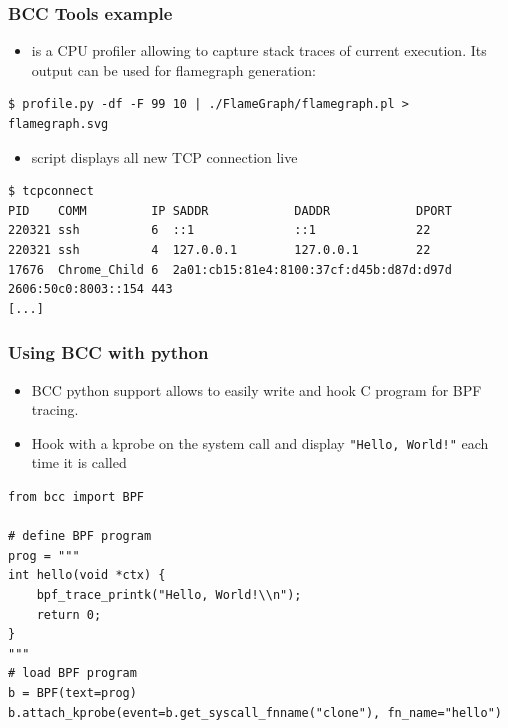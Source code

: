 \begin{frame}[fragile]
  \frametitle{BCC Tools example}
  \begin{itemize}
    \item {} is a CPU profiler allowing to capture stack traces of
          current execution. Its output can be used for flamegraph generation:
  \end{itemize}
  \begin{block}{}
    \begin{verbatim}
$ profile.py -df -F 99 10 | ./FlameGraph/flamegraph.pl > flamegraph.svg
    \end{verbatim}
  \end{block}
  \begin{itemize}
    \item {} script displays all new TCP connection live
  \end{itemize}
  \begin{block}{}
    \begin{verbatim}
$ tcpconnect
PID    COMM         IP SADDR            DADDR            DPORT
220321 ssh          6  ::1              ::1              22   
220321 ssh          4  127.0.0.1        127.0.0.1        22   
17676  Chrome_Child 6  2a01:cb15:81e4:8100:37cf:d45b:d87d:d97d 2606:50c0:8003::154 443  
[...]
    \end{verbatim}
  \end{block}
\end{frame}

\begin{frame}[fragile]
  \frametitle{Using BCC with python}
  \begin{itemize}
    \item BCC python support allows to easily write and hook C program for BPF
          tracing.
    \item Hook with a kprobe on the  system call and display \verb+"Hello, World!"+ each
          time it is called
  \end{itemize}
  \begin{block}{}
    \begin{verbatim}
from bcc import BPF

# define BPF program
prog = """
int hello(void *ctx) {
    bpf_trace_printk("Hello, World!\\n");
    return 0;
}
"""
# load BPF program
b = BPF(text=prog)
b.attach_kprobe(event=b.get_syscall_fnname("clone"), fn_name="hello")
    \end{verbatim}
  \end{block}
\end{frame}

